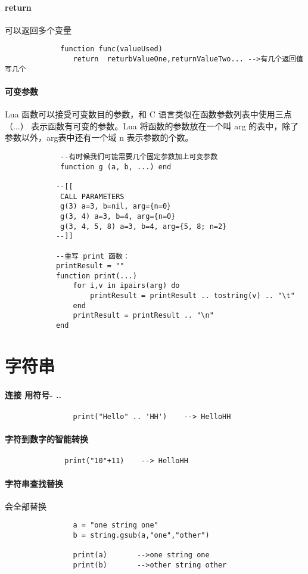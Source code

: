 \documentclass[UTF8,a4paper,8pt]{ctexart}
\begin{document}
	\paragraph{return}
		可以返回多个变量
		 \begin{lstlisting}
			 function func(valueUsed)  
			    return  returbValueOne,returnValueTwo... -->有几个返回值写几个
		 \end{lstlisting}
		 
	\paragraph{可变参数}Lua 函数可以接受可变数目的参数，和 C 语言类似在函数参数列表中使用三点（...）
	表示函数有可变的参数。Lua 将函数的参数放在一个叫 arg 的表中，除了参数以外，arg表中还有一个域 n 表示参数的个数。
		 \begin{lstlisting}
			 --有时候我们可能需要几个固定参数加上可变参数
			 function g (a, b, ...) end
			 
			--[[ 
			 CALL PARAMETERS
			 g(3) a=3, b=nil, arg={n=0}
			 g(3, 4) a=3, b=4, arg={n=0}
			 g(3, 4, 5, 8) a=3, b=4, arg={5, 8; n=2}
			--]]
			
			--重写 print 函数：
			printResult = ""
			function print(...)
				for i,v in ipairs(arg) do
					printResult = printResult .. tostring(v) .. "\t"
				end
				printResult = printResult .. "\n"
			end
		 \end{lstlisting}
\newpage
\section{字符串}
 	 \paragraph{连接 用符号- ..   }
	 		 \begin{lstlisting}
	 		 	print("Hello" .. 'HH')    --> HelloHH
	 		 \end{lstlisting}
 		 
 	 \paragraph{字符到数字的智能转换}
	 		  \begin{lstlisting}
	 		  print("10"+11)    --> HelloHH
	 		  \end{lstlisting}
	 		  
	 \paragraph{字符串查找替换}会全部替换
			  \begin{lstlisting}
				a = "one string one"
				b = string.gsub(a,"one","other")
				
				print(a)       -->one string one
				print(b)	   -->other string other
		  	  \end{lstlisting}
	 		  
\end{document}
